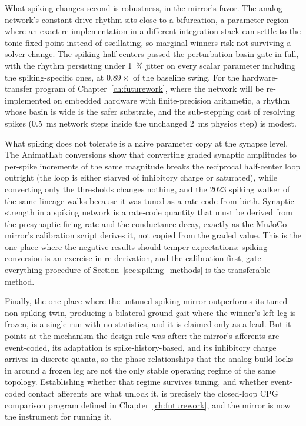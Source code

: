 What spiking changes second is robustness, in the mirror's favor. The analog network's constant-drive rhythm sits close to a bifurcation, a parameter region where an exact re-implementation in a different integration stack can settle to the tonic fixed point instead of oscillating, so marginal winners risk not surviving a solver change. The spiking half-centers passed the perturbation basin gate in full, with the rhythm persisting under \qty{1}{\percent} jitter on every scalar parameter including the spiking-specific ones, at $0.89\times$ of the baseline swing. For the hardware-transfer program of Chapter~\ref{ch:futurework}, where the network will be re-implemented on embedded hardware with finite-precision arithmetic, a rhythm whose basin is wide is the safer substrate, and the sub-stepping cost of resolving spikes (\qty{0.5}{\milli\second} network steps inside the unchanged \qty{2}{\milli\second} physics step) is modest.

What spiking does not tolerate is a naive parameter copy at the synapse level. The AnimatLab conversions show that converting graded synaptic amplitudes to per-spike increments of the same magnitude breaks the reciprocal half-center loop outright (the loop is either starved of inhibitory charge or saturated), while converting only the thresholds changes nothing, and the 2023 spiking walker of the same lineage walks because it was tuned as a rate code from birth. Synaptic strength in a spiking network is a rate-code quantity that must be derived from the presynaptic firing rate and the conductance decay, exactly as the MuJoCo mirror's calibration script derives it, not copied from the graded value. This is the one place where the negative results should temper expectations: spiking conversion is an exercise in re-derivation, and the calibration-first, gate-everything procedure of Section~\ref{sec:spiking_methods} is the transferable method.

Finally, the one place where the untuned spiking mirror outperforms its tuned non-spiking twin, producing a bilateral ground gait where the winner's left leg is frozen, is a single run with no statistics, and it is claimed only as a lead. But it points at the mechanism the design rule was after: the mirror's afferents are event-coded, its adaptation is spike-history-based, and its inhibitory charge arrives in discrete quanta, so the phase relationships that the analog build locks in around a frozen leg are not the only stable operating regime of the same topology. Establishing whether that regime survives tuning, and whether event-coded contact afferents are what unlock it, is precisely the closed-loop CPG comparison program defined in Chapter~\ref{ch:futurework}, and the mirror is now the instrument for running it.


